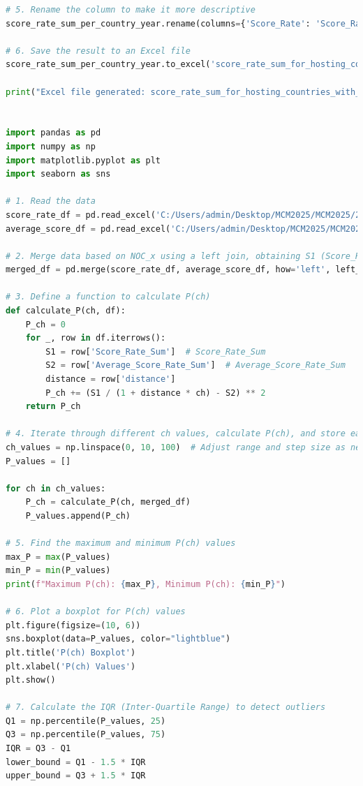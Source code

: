 \documentclass[12pt]{article}
\begin{document}
\begin{lstlisting}[language=Python, style=mystyle, caption=data\_analyze.ipynb]
# 5. Rename the column to make it more descriptive
score_rate_sum_per_country_year.rename(columns={'Score_Rate': 'Score_Rate_Sum'}, inplace=True)

# 6. Save the result to an Excel file
score_rate_sum_per_country_year.to_excel('score_rate_sum_for_hosting_countries_with_distance.xlsx', index=False)

print("Excel file generated: score_rate_sum_for_hosting_countries_with_distance.xlsx")


import pandas as pd
import numpy as np
import matplotlib.pyplot as plt
import seaborn as sns

# 1. Read the data
score_rate_df = pd.read_excel('C:/Users/admin/Desktop/MCM2025/MCM2025/2025_Problem_C_Data/score_rate_sum_for_hosting_countries_with_distance.xlsx')
average_score_df = pd.read_excel('C:/Users/admin/Desktop/MCM2025/MCM2025/2025_Problem_C_Data/average_score_rate_sum_nonhost.xlsx')

# 2. Merge data based on NOC_x using a left join, obtaining S1 (Score_Rate_Sum) and S2 (Average_Score_Rate_Sum) for each country
merged_df = pd.merge(score_rate_df, average_score_df, how='left', left_on='NOC_x', right_on='NOC_x')

# 3. Define a function to calculate P(ch)
def calculate_P(ch, df):
    P_ch = 0
    for _, row in df.iterrows():
        S1 = row['Score_Rate_Sum']  # Score_Rate_Sum
        S2 = row['Average_Score_Rate_Sum']  # Average_Score_Rate_Sum
        distance = row['distance']
        P_ch += (S1 / (1 + distance * ch) - S2) ** 2
    return P_ch

# 4. Iterate through different ch values, calculate P(ch), and store each P(ch) value
ch_values = np.linspace(0, 10, 100)  # Adjust range and step size as needed
P_values = []

for ch in ch_values:
    P_ch = calculate_P(ch, merged_df)
    P_values.append(P_ch)

# 5. Find the maximum and minimum P(ch) values
max_P = max(P_values)
min_P = min(P_values)
print(f"Maximum P(ch): {max_P}, Minimum P(ch): {min_P}")

# 6. Plot a boxplot for P(ch) values
plt.figure(figsize=(10, 6))
sns.boxplot(data=P_values, color="lightblue")
plt.title('P(ch) Boxplot')
plt.xlabel('P(ch) Values')
plt.show()

# 7. Calculate the IQR (Inter-Quartile Range) to detect outliers
Q1 = np.percentile(P_values, 25)
Q3 = np.percentile(P_values, 75)
IQR = Q3 - Q1
lower_bound = Q1 - 1.5 * IQR
upper_bound = Q3 + 1.5 * IQR


\end{lstlisting}
\end{document}
